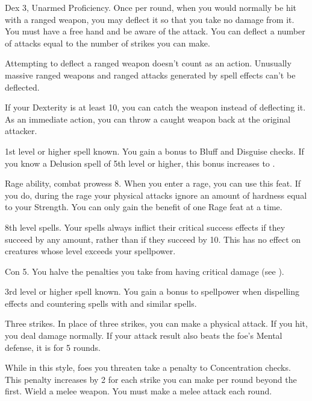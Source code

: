 \featpres Dex 3, Unarmed Proficiency.
\featben Once per round, when you would normally be hit with a ranged weapon, you may deflect it so that you take no damage from it.
You must have a free hand and be aware of the attack.
You can deflect a number of attacks equal to the number of strikes you can make.
\par Attempting to deflect a ranged weapon doesn't count as an action.
Unusually massive ranged weapons and ranged attacks generated by spell effects can't be deflected.
\par If your Dexterity is at least 10, you can catch the weapon instead of deflecting it.
As an immediate action, you can throw a caught weapon back at the original attacker.

\featpre 1st level or higher  spell known.
\featben You gain a  bonus to Bluff and Disguise checks.
If you know a Delusion spell of 5th level or higher, this bonus increases to .

\featpres Rage ability, combat prowess 8.
\featben When you enter a rage, you can use this feat. If you do, during the rage your physical attacks ignore an amount of hardness equal to your Strength.
 You can only gain the benefit of one Rage feat at a time.

\featpre 8th level spells.
\featben Your spells always inflict their critical success effects if they succeed by any amount, rather than if they succeed by 10.
This has no effect on creatures whose level exceeds your spellpower.

\featpre Con 5.
\featben You halve the penalties you take from having critical damage (see ).

\featpre 3rd level or higher  spell known.
\featben You gain a  bonus to spellpower when dispelling effects and countering spells with  and similar spells.

\featpre Three strikes.
\featben In place of three strikes, you can make a physical attack.
If you hit, you deal damage normally.
If your attack result also beats the foe's Mental defense, it is \disoriented for 5 rounds.

\featben While in this style, foes you threaten take a  penalty to Concentration checks.
This penalty increases by 2 for each strike you can make per round beyond the first.
\stylereq Wield a melee weapon. You must make a melee attack each round.


